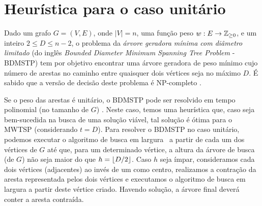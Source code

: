 

\section{Heurística para o caso unitário}
\label{sec:mwsp_preprocessamento}
Dado um grafo $G = (V,E)$, onde $|V| = n$, uma função peso 
$w: E \to \mathbb{Z}_{\ge 0}$, e um inteiro $2 \le D \le n - 2$,  
o problema da \emph{árvore geradora mínima com diâmetro limitado} (do 
inglês \emph{Bounded Diameter Minimum Spanning Tree Problem} - BDMSTP) 
tem por objetivo encontrar uma árvore geradora de peso mínimo cujo número
de arestas no caminho entre quaisquer dois vértices seja no máximo $D$. 
É sabido que a 
versão de decisão deste problema é NP-completo \cite{GareyJ1990}. 

Se o peso das arestas é unitário, o BDMSTP pode ser resolvido em tempo
polinomial (no tamanho de $G$) \cite{GareyJ1990}.
Neste caso, temos uma heurística que, caso seja bem-sucedida na
  busca de uma solução viável, tal solução é ótima para o MWTSP
  (considerando $t = D$).
Para resolver o BDMSTP no caso unitário,
podemos executar o algoritmo de busca em largura~\cite{CormenLRS2009}
a partir de
cada um dos vértices de $G$ até que, para um determinado vértice,
a altura da árvore de busca (de $G$) não seja maior do que
$h = \lfloor D / 2\rfloor$. Caso $h$ seja ímpar, consideramos cada dois vértices
(adjacentes) ao invés de um como centro, realizamos a contração da aresta
representada pelos dois vértices e executamos o algoritmo de busca em largura
a partir deste vértice criado. Havendo solução, a árvore final deverá conter
a aresta contraída.



